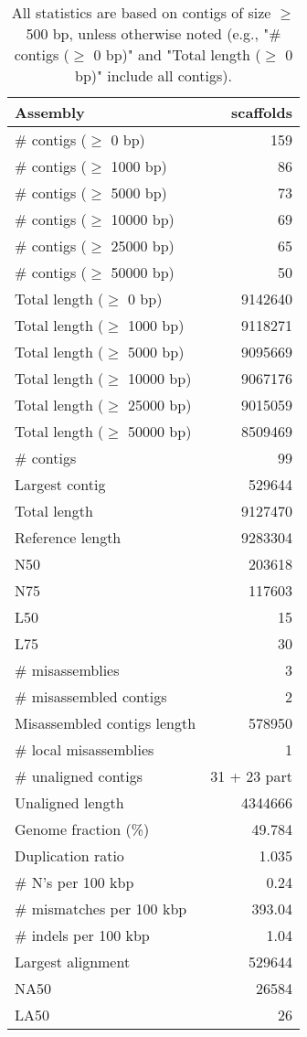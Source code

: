 \documentclass[12pt,a4paper]{article}
\begin{document}
\begin{table}[ht]
\begin{center}
\caption{All statistics are based on contigs of size $\geq$ 500 bp, unless otherwise noted (e.g., "\# contigs ($\geq$ 0 bp)" and "Total length ($\geq$ 0 bp)" include all contigs).}
\begin{tabular}{|l*{1}{|r}|}
\hline
Assembly & scaffolds \\ \hline
\# contigs ($\geq$ 0 bp) & 159 \\ \hline
\# contigs ($\geq$ 1000 bp) & 86 \\ \hline
\# contigs ($\geq$ 5000 bp) & 73 \\ \hline
\# contigs ($\geq$ 10000 bp) & 69 \\ \hline
\# contigs ($\geq$ 25000 bp) & 65 \\ \hline
\# contigs ($\geq$ 50000 bp) & 50 \\ \hline
Total length ($\geq$ 0 bp) & 9142640 \\ \hline
Total length ($\geq$ 1000 bp) & 9118271 \\ \hline
Total length ($\geq$ 5000 bp) & 9095669 \\ \hline
Total length ($\geq$ 10000 bp) & 9067176 \\ \hline
Total length ($\geq$ 25000 bp) & 9015059 \\ \hline
Total length ($\geq$ 50000 bp) & 8509469 \\ \hline
\# contigs & 99 \\ \hline
Largest contig & 529644 \\ \hline
Total length & 9127470 \\ \hline
Reference length & 9283304 \\ \hline
N50 & 203618 \\ \hline
N75 & 117603 \\ \hline
L50 & 15 \\ \hline
L75 & 30 \\ \hline
\# misassemblies & 3 \\ \hline
\# misassembled contigs & 2 \\ \hline
Misassembled contigs length & 578950 \\ \hline
\# local misassemblies & 1 \\ \hline
\# unaligned contigs & 31 + 23 part \\ \hline
Unaligned length & 4344666 \\ \hline
Genome fraction (\%) & 49.784 \\ \hline
Duplication ratio & 1.035 \\ \hline
\# N's per 100 kbp & 0.24 \\ \hline
\# mismatches per 100 kbp & 393.04 \\ \hline
\# indels per 100 kbp & 1.04 \\ \hline
Largest alignment & 529644 \\ \hline
NA50 & 26584 \\ \hline
LA50 & 26 \\ \hline
\end{tabular}
\end{center}
\end{table}
\end{document}
